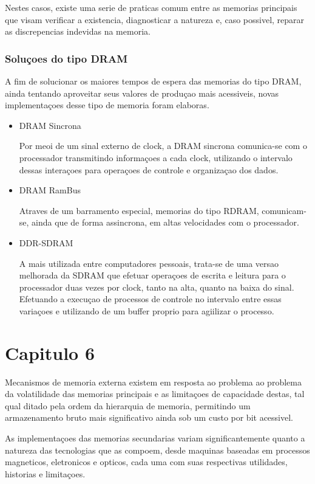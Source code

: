 \documentclass[12pt]{article}
\begin{document}
Nestes casos, existe uma serie de praticas comum entre as memorias principais que visam verificar a existencia, diagnosticar a natureza e, caso possivel, reparar as discrepencias indevidas na memoria. 


\subsubsection*{Soluçoes do tipo DRAM}
A fim de solucionar os maiores tempos de espera das memorias do tipo DRAM, ainda tentando aproveitar seus valores de produçao mais acessiveis, novas implementaçoes desse tipo de memoria foram elaboras.

\begin{itemize}
\item DRAM Sincrona

Por meoi de um sinal externo de clock, a DRAM sincrona comunica-se com o processador transmitindo informaçoes a cada clock, utilizando o intervalo dessas interaçoes para operaçoes de controle e organizaçao dos dados.

\item DRAM RamBus

Atraves de um barramento especial, memorias do tipo RDRAM, comunicam-se, ainda que de forma assincrona, em altas velocidades com o processador.

\item DDR-SDRAM

A mais utilizada entre computadores pessoais, trata-se de uma versao melhorada da SDRAM que efetuar operaçoes de escrita e leitura para o processador duas vezes por clock, tanto na alta, quanto na baixa do sinal. Efetuando a execuçao de processos de controle no intervalo entre essas variaçoes e utilizando de um buffer proprio para agiilizar o processo.
\end{itemize}
\section{Capitulo 6}
Mecanismos de memoria externa existem em resposta ao problema ao problema da volatilidade das memorias principais e as limitaçoes de capacidade destas, tal qual ditado pela ordem da hierarquia de memoria, permitindo um armazenamento bruto mais significativo ainda sob um custo por bit acessivel.

As implementaçoes das memorias secundarias variam significantemente quanto a natureza das tecnologias que as compoem, desde maquinas baseadas em processos magneticos, eletronicos e opticos, cada uma com suas respectivas utilidades, historias e limitaçoes.
\end{document}
